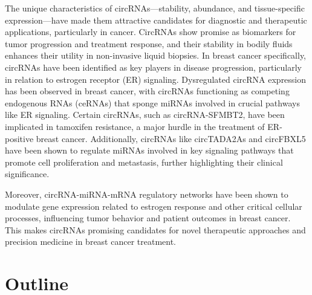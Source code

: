 The unique characteristics of circRNAs—stability, abundance, and
tissue-specific expression—have made them attractive candidates for diagnostic
and therapeutic applications, particularly in cancer.
CircRNAs show promise as biomarkers for tumor progression and treatment
response\supercite{bao_prognostic_2020,ren_construction_2017}, and their
stability in bodily fluids enhances their utility in non-invasive liquid
biopsies\supercite{bao_prognostic_2020,zhang_circular_2018}.
In breast cancer specifically, circRNAs have been identified as key players in
disease progression, particularly in relation to estrogen receptor (ER)
signaling.
Dysregulated circRNA expression has been observed in breast cancer, with
circRNAs functioning as competing endogenous RNAs (ceRNAs) that sponge miRNAs
involved in crucial pathways like ER
signaling\supercite{nair_circular_2016,xu_circrna_2022}.
Certain circRNAs, such as circRNA-SFMBT2, have been implicated in tamoxifen
resistance, a major hurdle in the treatment of ER-positive breast
cancer\supercite{li_circrna-sfmbt2_2023}.
Additionally, circRNAs like circTADA2As and circFBXL5 have been shown to
regulate miRNAs involved in key signaling pathways that promote cell
proliferation and metastasis, further highlighting their clinical
significance\supercite{xu_circtada2as_2019,gao_hsa_circrna_0006528_2019}.

Moreover, circRNA-miRNA-mRNA regulatory networks have been shown to modulate
gene expression related to estrogen response and other critical cellular
processes, influencing tumor behavior and patient outcomes in breast
cancer\supercite{xu_circrna_2022,nair_circular_2016}.
This makes circRNAs promising candidates for novel therapeutic approaches and
precision medicine in breast cancer treatment.

\section{Outline}

